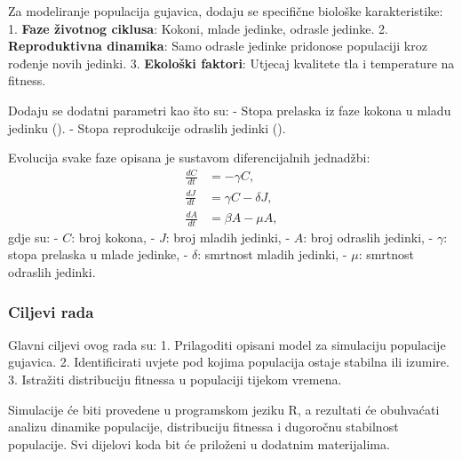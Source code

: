 \documentclass[
]{article}
\begin{document}
Za modeliranje populacija gujavica, dodaju se specifične biološke
karakteristike: 1. \textbf{Faze životnog ciklusa}: Kokoni, mlade
jedinke, odrasle jedinke. 2. \textbf{Reproduktivna dinamika}: Samo
odrasle jedinke pridonose populaciji kroz rođenje novih jedinki. 3.
\textbf{Ekološki faktori}: Utjecaj kvalitete tla i temperature na
fitness.

Dodaju se dodatni parametri kao što su: - Stopa prelaska iz faze kokona
u mladu jedinku (\gamma). - Stopa reprodukcije odraslih jedinki (\beta).

Evolucija svake faze opisana je sustavom diferencijalnih jednadžbi: \[
\begin{align*}
\frac{dC}{dt} &= -\gamma C, \\
\frac{dJ}{dt} &= \gamma C - \delta J, \\
\frac{dA}{dt} &= \beta A - \mu A,
\end{align*}
\] gdje su: - \(C\): broj kokona, - \(J\): broj mladih jedinki, - \(A\):
broj odraslih jedinki, - \(\gamma\): stopa prelaska u mlade jedinke, -
\(\delta\): smrtnost mladih jedinki, - \(\mu\): smrtnost odraslih
jedinki.

\subsubsection{Ciljevi rada}\label{ciljevi-rada}

Glavni ciljevi ovog rada su: 1. Prilagoditi opisani model za simulaciju
populacije gujavica. 2. Identificirati uvjete pod kojima populacija
ostaje stabilna ili izumire. 3. Istražiti distribuciju fitnessa u
populaciji tijekom vremena.

Simulacije će biti provedene u programskom jeziku R, a rezultati će
obuhvaćati analizu dinamike populacije, distribuciju fitnessa i
dugoročnu stabilnost populacije. Svi dijelovi koda bit će priloženi u
dodatnim materijalima.
\end{document}
